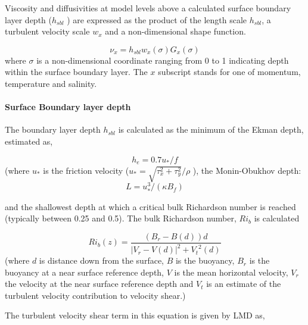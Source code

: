 Viscosity and diffusivities at model levels above a calculated
surface boundary layer depth ($h_{sbl}$ ) are expressed as the product
of the length scale $h_{sbl}$, a turbulent velocity scale $w_x$ and a
non-dimensional shape function.

\begin{equation}
\nu_x = h_{sbl} w_x(\sigma)G_x(\sigma)
\end{equation}
where $\sigma$ is a non-dimensional coordinate ranging from 0 to 1
indicating depth within the surface boundary layer. The $x$ subscript
stands for one of momentum, temperature and salinity.

\paragraph{Surface Boundary layer depth}
The boundary layer depth $h_{sbl}$ is calculated as the minimum of the
Ekman depth, estimated as,

\begin{equation}
h_e=0.7u_*/f
\end{equation}
(where $u_*$ is the friction velocity ($u_*=\sqrt{\tau_x^2+\tau_y^2}/\rho$ ),
 the Monin-Obukhov depth:
\begin{equation}
L=u_*^3/(\kappa B_f)
\end{equation}

\noindent and the shallowest depth at which a critical bulk Richardson
number is reached (typically between 0.25 and 0.5). The bulk Richardson
number, $Ri_b$ is calculated


\begin{equation}
Ri_b(z)=\frac{(B_r-B(d))d}{|V_r-V(d)|^2+{V_t}^2(d)}
\end{equation}
(where $d$ is distance down from the surface, $B$ is the buoyancy,
$B_r$ is the buoyancy at a near surface
reference depth, $V$ is the mean horizontal velocity, $V_r$ the
velocity at the near surface reference depth and $V_t$ is an estimate
of the turbulent velocity contribution to velocity shear.)

The turbulent velocity shear term in this equation is given by LMD as,

